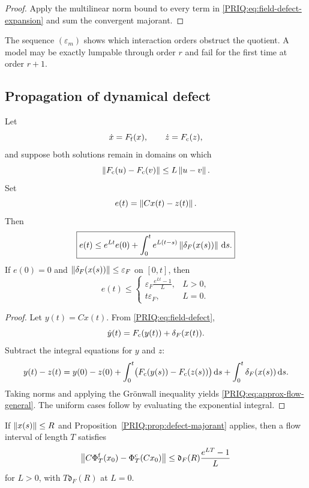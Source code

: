 \begin{proof}
Apply the multilinear norm bound to every term in \eqref{PRIQ:eq:field-defect-expansion} and sum the convergent majorant.
\end{proof}

The sequence $(\varepsilon_m)$ shows which interaction orders obstruct the quotient.  A model may be exactly lumpable through order $r$ and fail for the first time at order $r+1$.

\subsection{Propagation of dynamical defect}

\begin{PRIQtheorem}\label{PRIQ:thm:approx-flow-bound}
Let
\[
  \dot x=F_{\mathrm f}(x),
  \qquad
  \dot z=F_{\mathrm c}(z),
\]
and suppose both solutions remain in domains on which
\[
  \left\lVert F_{\mathrm c}(u)-F_{\mathrm c}(v)\right\rVert
  \leq L\left\lVert u-v\right\rVert.
\]
Set
\[
  e(t)=\left\lVert Cx(t)-z(t)\right\rVert.
\]
Then
\begin{equation}\label{PRIQ:eq:approx-flow-general}
  \boxed{
  e(t)
  \leq
  e^{Lt}e(0)
  +
  \int_0^t e^{L(t-s)}\left\lVert \delta_F(x(s))\right\rVert\,\mathrm d s.}
\end{equation}
If $e(0)=0$ and $\left\lVert \delta_F(x(s))\right\rVert\leq\varepsilon_F$ on $[0,t]$, then
\begin{equation}\label{PRIQ:eq:approx-flow-uniform}
  e(t)
  \leq
  \begin{cases}
  \displaystyle
  \varepsilon_F\frac{e^{Lt}-1}{L},&L>0,\\[1.1ex]
  t\varepsilon_F,&L=0.
  \end{cases}
\end{equation}
\end{PRIQtheorem}

\begin{proof}
Let $y(t)=Cx(t)$.  From \eqref{PRIQ:eq:field-defect},
\[
  \dot y(t)=F_{\mathrm c}(y(t))+\delta_F(x(t)).
\]
Subtract the integral equations for $y$ and $z$:
\[
  y(t)-z(t)
  =y(0)-z(0)
  +\int_0^t
  \bigl(F_{\mathrm c}(y(s))-F_{\mathrm c}(z(s))\bigr)\,\mathrm d s
  +\int_0^t\delta_F(x(s))\,\mathrm d s.
\]
Taking norms and applying the Grönwall inequality yields \eqref{PRIQ:eq:approx-flow-general}.  The uniform cases follow by evaluating the exponential integral.
\end{proof}

\begin{PRIQcorollary}\label{PRIQ:cor:coefficient-flow-certificate}
If $\left\lVert x(s)\right\rVert\leq R$ and Proposition~\ref{PRIQ:prop:defect-majorant} applies, then a flow interval of length $T$ satisfies
\[
  \left\lVert C\Phi_T^{\mathrm f}(x_0)-\Phi_T^{\mathrm c}(Cx_0)\right\rVert
  \leq
  \mathfrak d_F(R)\frac{e^{LT}-1}{L}
\]
for $L>0$, with $T\mathfrak d_F(R)$ at $L=0$.
\end{PRIQcorollary}

